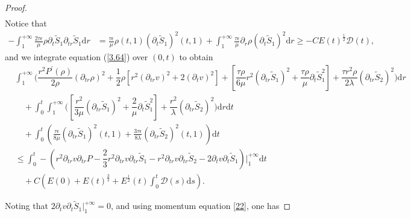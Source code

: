 \documentclass[10pt,a4paper]{amsart}
\begin{document}
\begin{proof}
\begin{equation}
\begin{aligned}
			\end{aligned}
		\end{equation}
		Notice that
		\begin{equation}\nonumber
			\begin{aligned}
				-\int_{1}^{+\infty}\frac{2\tau\epsilon}{\mu}\rho\partial_{t}\tilde{S}_1
				\partial_{tr}\tilde{S}_1\mathrm{d}r
				&=\frac{\tau\epsilon}{\mu}\rho(t,1)(\partial_{t}\tilde{S}_1)^2(t,1)
				+\int_{1}^{+\infty}\frac{\tau\epsilon}{\mu}\partial_r\rho(\partial_{t}\tilde{S}_1)^2
				\mathrm{d}r
				\geq %
				-C E(t)^{\frac{1}{2}}\mathcal{D}(t),
			\end{aligned}
		\end{equation}
		and we integrate equation (\ref{3.64}) over $(0,t)$ to obtain
		\begin{equation}\nonumber
			\begin{aligned}
				&\int_{1}^{+\infty}\bigg(\dfrac{r^2 P^{\prime}(\rho)}{2\rho} \left(\partial_{tr} \rho\right)^2 +\dfrac{1}{2}\rho\left[r^2 (\partial_{tr}v)^2+2 (\partial_{t}v)^2\right]+ \left[\dfrac{\tau\rho}{6\mu} r^2(\partial_{tr}\tilde{S}_1)^2+\dfrac{\tau\rho}{\mu} \partial_{t}\tilde{S}_1^2\right]
				+\dfrac{\tau r^2\rho}{2\lambda} (\partial_{tr} \tilde{S}_2)^2\bigg)\mathrm{d}r\\
				&\quad+\int_{0}^{t}\int_{1}^{+\infty}\bigg(\left[\dfrac{r^2}{3\mu}(\partial_{tr}\tilde{S}_1)^2+\dfrac{2}{\mu} \partial_{t}\tilde{S}_1^2\right]
				+\dfrac{r^2}{\lambda}(\partial_{tr}\tilde{S}_2)^2\bigg)\mathrm{d}r\mathrm{d}t\\
				&\quad+\int_{0}^{t}\left(\frac{\tau\epsilon}{8\mu}(\partial_{tr}\tilde{S}_1)^2(t,1)
				+\frac{3\tau\epsilon}{8\lambda}(\partial_{tr}\tilde{S}_2)^2(t,1)\right)\mathrm{d}t\\
				&\leq 
				\int_{0}^{t}-\left(r^2\partial_{tr}v \partial_{tr}P
				-\dfrac{2}{3} r^2  \partial_{tr}v \partial_{tr}\tilde{S}_1
				-r^2  \partial_{tr}v \partial_{tr}\tilde{S}_2
				-2\partial_{t}v\partial_{t}\tilde{S}_1\right)\bigg|_{1}^{+\infty} \mathrm{d}t\\
				&\quad+C\left(E(0)+E(t)^{\frac{3}{2}}+ E^{\frac{1}{2}}(t) \int_{0}^t \mathcal{D}(s)\mathrm{d}s\right)
				.
			\end{aligned}
		\end{equation}
		
		Noting that $2\partial_{t}v\partial_{t}\tilde{S}_1\big|_{1}^{+\infty}=0$, and using momentum equation \eqref{22}, one has
		

\end{proof}
\end{document}
